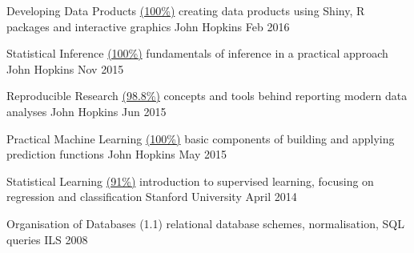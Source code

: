 \begin{cvhonors}
  \cvhonor
    {Developing Data Products \href{https://www.coursera.org/account/accomplishments/records/F3L83LBF9AN9}{(100\%)}} %
    {creating data products using Shiny, R packages and interactive graphics} %
    {John Hopkins} %
    {Feb 2016} %


  \cvhonor
    {Statistical Inference \href{https://www.coursera.org/account/accomplishments/certificate/3S6K2J45LQ}{(100\%)}} %
    {fundamentals of inference in a practical approach} %
    {John Hopkins} %
    {Nov 2015} %
    
  \cvhonor
    {Reproducible Research \href{https://www.coursera.org/account/accomplishments/certificate/MPCJPEWPPR}{(98.8\%)}} %
    {concepts and tools behind reporting modern data analyses} %
    {John Hopkins} %
    {Jun 2015} %

  \cvhonor
    {Practical Machine Learning \href{https://www.coursera.org/account/accomplishments/certificate/R4ATJF7PRL}{(100\%)}} %
    {basic components of building and applying prediction functions} %
    {John Hopkins} %
    {May 2015} %
     
    
  \cvhonor
    {Statistical Learning \href{https://verify.class.stanford.edu/SOA/e01a5cc35a304eb5a8b4a20101d83c08/}{(91\%)}} %
    {introduction to supervised learning, focusing on regression and classification} %
    {Stanford University} %
    {April 2014} %
    
         
  \cvhonor
    {Organisation of Databases (1.1)} %
    {relational database schemes, normalisation, SQL queries} %
    {ILS} %
    {2008} %
\end{cvhonors}